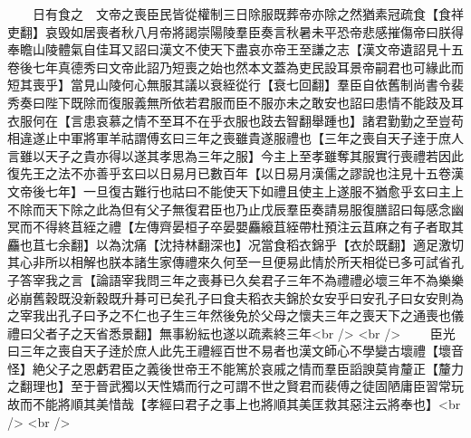 　　日有食之　文帝之喪臣民皆從權制三日除服既葬帝亦除之然猶素冠疏食【食祥吏翻】哀毁如居喪者秋八月帝將謁崇陽陵羣臣奏言秋暑未平恐帝悲感摧傷帝曰朕得奉瞻山陵體氣自佳耳又詔曰漢文不使天下盡哀亦帝王至謙之志【漢文帝遺詔見十五卷後七年真德秀曰文帝此詔乃短喪之始也然本文蓋為吏民設耳景帝嗣君也可緣此而短其喪乎】當見山陵何心無服其議以衰絰從行【衰七回翻】羣臣自依舊制尚書令裴秀奏曰陛下既除而復服義無所依若君服而臣不服亦未之敢安也詔曰患情不能跂及耳衣服何在【言患哀慕之情不至耳不在乎衣服也跂去智翻舉踵也】諸君勤勤之至豈苟相違遂止中軍將軍羊祜謂傅玄曰三年之喪雖貴遂服禮也【三年之喪自天子逹于庶人言雖以天子之貴亦得以遂其孝思為三年之服】今主上至孝雖奪其服實行喪禮若因此復先王之法不亦善乎玄曰以日易月已數百年【以日易月漢儒之謬說也注見十五卷漢文帝後七年】一旦復古難行也祜曰不能使天下如禮且使主上遂服不猶愈乎玄曰主上不除而天下除之此為但有父子無復君臣也乃止戊辰羣臣奏請易服復膳詔曰每感念幽冥而不得終苴絰之禮【左傳齊晏桓子卒晏嬰麤縗苴絰帶杜預注云苴麻之有子者取其麤也苴七余翻】以為沈痛【沈持林翻深也】况當食稻衣錦乎【衣於既翻】適足激切其心非所以相解也朕本諸生家傳禮來久何至一旦便易此情於所天相從已多可試省孔子答宰我之言【論語宰我問三年之喪朞已久矣君子三年不為禮禮必壞三年不為樂樂必崩舊穀既没新穀既升朞可已矣孔子曰食夫稻衣夫錦於女安乎曰安孔子曰女安則為之宰我出孔子曰予之不仁也子生三年然後免於父母之懷夫三年之喪天下之通喪也儀禮曰父者子之天省悉景翻】無事紛紜也遂以疏素終三年<br />
<br />
　　臣光曰三年之喪自天子逹於庶人此先王禮經百世不易者也漢文師心不學變古壞禮【壞音怪】絶父子之恩虧君臣之義後世帝王不能篤於哀戚之情而羣臣謟諛莫肯釐正【釐力之翻理也】至于晉武獨以天性矯而行之可謂不世之賢君而裴傅之徒固陋庸臣習常玩故而不能將順其美惜哉【孝經曰君子之事上也將順其美匡救其惡注云將奉也】<br />
<br />
